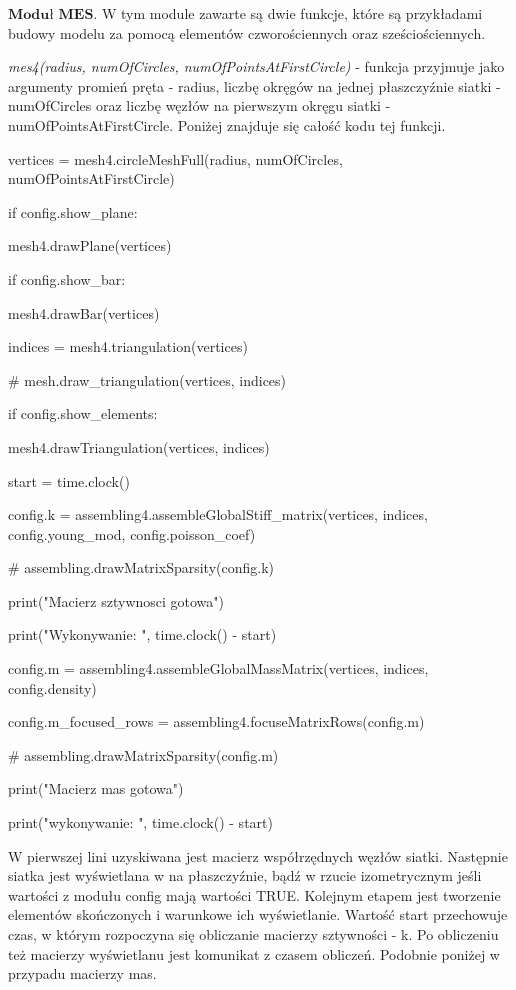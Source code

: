  \( \textbf{Moduł MES} \).
W tym module zawarte są dwie funkcje, które są przykładami budowy modelu za pomocą elementów czworościennych oraz sześciościennych.

\textit{mes4(radius, numOfCircles, numOfPointsAtFirstCircle)} - funkcja przyjmuje jako argumenty promień pręta - radius, liczbę okręgów na jednej płaszczyźnie siatki - numOfCircles oraz liczbę węzłów na pierwszym okręgu siatki - numOfPointsAtFirstCircle. Poniżej znajduje się całość kodu tej funkcji.

\vspace {3mm}

    vertices = mesh4.circleMeshFull(radius, numOfCircles, numOfPointsAtFirstCircle)

    if config.show\_plane:

        mesh4.drawPlane(vertices)

    if config.show\_bar:

        mesh4.drawBar(vertices)

\vspace {3mm}
    indices = mesh4.triangulation(vertices)

    \# mesh.draw\_triangulation(vertices, indices)

    if config.show\_elements:

        mesh4.drawTriangulation(vertices, indices)

\vspace {3mm}
    start = time.clock()

    config.k = assembling4.assembleGlobalStiff\_matrix(vertices, indices, config.young\_mod, config.poisson\_coef)

    \# assembling.drawMatrixSparsity(config.k)

    print("Macierz sztywnosci gotowa")

    print("Wykonywanie: ", time.clock() - start)

\vspace {3mm}
    config.m = assembling4.assembleGlobalMassMatrix(vertices, indices, config.density)

    config.m\_focused\_rows = assembling4.focuseMatrixRows(config.m)

    \# assembling.drawMatrixSparsity(config.m)

    print("Macierz mas gotowa")

    print("wykonywanie: ", time.clock() - start)

\vspace {3mm}

W pierwszej lini uzyskiwana jest macierz współrzędnych węzłów siatki. Następnie siatka jest wyświetlana w na płaszczyźnie, bądź w rzucie izometrycznym jeśli wartości z modułu config mają wartości TRUE. Kolejnym etapem jest tworzenie elementów skończonych i warunkowe ich wyświetlanie. Wartość start przechowuje czas, w którym rozpoczyna się obliczanie macierzy sztywności - k. Po obliczeniu też macierzy wyświetlanu jest komunikat z czasem obliczeń.  Podobnie poniżej w przypadu macierzy mas.

